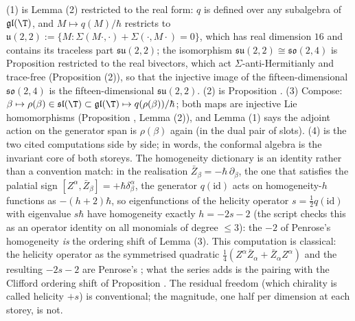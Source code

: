 (1) is Lemma (2) restricted to the real form: $q$ is defined over any subalgebra of $\mathfrak{gl}(\T)$, and $M \mapsto q(M)/\hbar$ restricts to $\mathfrak{u}(2,2) := \{M : \Sigma(M\cdot,\cdot) + \Sigma(\cdot,M\cdot) = 0\}$, which has real dimension $16$ and contains its traceless part $\mathfrak{su}(2,2)$; the isomorphism $\mathfrak{su}(2,2)\cong\mathfrak{so}(2,4)$ is Proposition  restricted to the real bivectors, which act $\Sigma$-anti-Hermitianly and trace-free (Proposition (2)), so that the injective image of the fifteen-dimensional $\mathfrak{so}(2,4)$ is the fifteen-dimensional $\mathfrak{su}(2,2)$. (2) is Proposition . (3) Compose: $\beta \mapsto \rho(\beta) \in \mathfrak{sl}(\T) \subset \mathfrak{gl}(\T) \mapsto q(\rho(\beta))/\hbar$; both maps are injective Lie homomorphisms (Proposition , Lemma (2)), and Lemma (1) says the adjoint action on the generator span is $\rho(\beta)$ again (in the dual pair of slots). (4) is the two cited computations side by side; in words, the conformal algebra is the invariant core of both storeys. The homogeneity dictionary is an identity rather than a convention match: in the realisation $\bar Z_\beta = -\hbar\,\partial_\beta$, the one that satisfies the palatial sign $[Z^\alpha, \bar Z_\beta] = +\hbar\delta^\alpha_\beta$, the generator $q(\mathrm{id})$ acts on homogeneity-$h$ functions as $-(h+2)\hbar$, so eigenfunctions of the helicity operator $s = \tfrac12 q(\mathrm{id})$ with eigenvalue $s\hbar$ have homogeneity exactly $h = -2s - 2$ (the script checks this as an operator identity on all monomials of degree $\le 3$): the $-2$ of Penrose's homogeneity \cite{Penrose1967, PenroseRindler86} \emph{is} the ordering shift of Lemma (3). This computation is classical: the helicity operator as the symmetrised quadratic $\tfrac14(Z^\alpha\bar Z_\alpha + \bar Z_\alpha Z^\alpha)$ and the resulting $-2s-2$ are Penrose's \cite[Vol.~2, Ch.~6]{PenroseRindler86}; what the series adds is the pairing with the Clifford ordering shift of Proposition . The residual freedom (which chirality is called helicity $+s$) is conventional; the magnitude, one half per dimension at each storey, is not.
